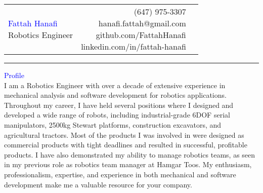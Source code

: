 \documentclass{letter}
\newcommand{\firstlastname}[1]{\noindent\textcolor{Blue}{\Huge{#1}}}
\newcommand{\subtitle}[1]{\noindent\textcolor{NavyBlue}{\Large{#1}}}
\newcommand{\header}[1]{\noindent\textcolor{Blue}{\Large{#1}}\\}
\begin{document}
\begin{table}
    \centering
    \begin{tabularx}{\textwidth}{X r l}
	\makecell[l]{\firstlastname{Fattah Hanafi}\\\subtitle{Robotics Engineer}} & \makecell[r]{(647) 975-3307\\hanafi.fattah@gmail.com\\github.com/FattahHanafi\\linkedin.com/in/fattah-hanafi} & \makecell[c]{\faPhone\\\faEnvelopeO\\\faGithub\\\faLinkedin}
    \end{tabularx}
\end{table}
\noindent\rule{\textwidth}{0.4pt}

\header{Profile}
\indent\small{I am a Robotics Engineer with over a decade of extensive experience in mechanical analysis and software development for robotics applications. Throughout my career, I have held several positions where I designed and developed a wide range of robots, including industrial-grade 6DOF serial manipulators, 2500kg Stewart platforms, construction excavators, and agricultural tractors. Most of the products I was involved in were designed as commercial products with tight deadlines and resulted in successful, profitable products. I have also demonstrated my ability to manage robotics teams, as seen in my previous role as robotics team manager at Hamgar Toos. My enthusiasm, professionalism, expertise, and experience in both mechanical and software development make me a valuable resource for your company.}
\end{document}
